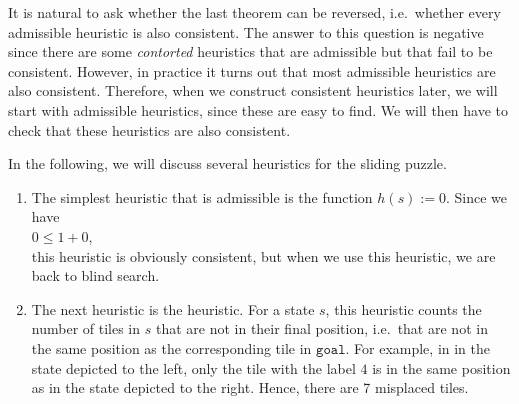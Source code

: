 It is natural to ask whether the last theorem can be reversed, i.e.~whether every admissible heuristic is also
consistent.  The answer to this question is negative since there are
some \emph{\color{red}contorted} heuristics that are admissible but that fail to be consistent.  However, in
practice it turns out that most 
admissible heuristics are also consistent.  Therefore, when we construct consistent heuristics later, we will
start with admissible heuristics, since these are easy to find.  We will then have to check that these
heuristics are also consistent.

\examples
In the following, we will discuss several heuristics for the sliding puzzle.
\begin{enumerate}
\item The simplest heuristic that is admissible is the function $h(s) := 0$.  Since we have
      \\[0.2cm]
      \hspace*{1.3cm}
      $0 \leq 1 + 0$,
      \\[0.2cm]
      this heuristic is obviously consistent, but when we use this heuristic, we are back to blind search.
\item The next heuristic is the  heuristic.  For a state $s$,
      this heuristic counts the number of tiles in $s$ that are not in their final position, i.e.~that are not
      in the same position as the corresponding tile in $\texttt{goal}$.  For example, in 
      in the state depicted to the left, only the tile with the label $4$ is in the same
      position as in the state depicted to the right.  Hence, there are 7 misplaced tiles.


\end{enumerate}
